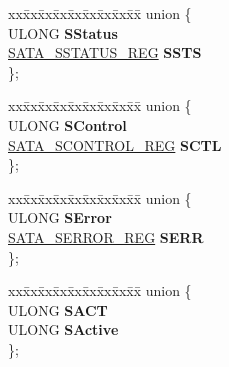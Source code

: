 \begin{DoxyCompactItemize}
\begin{tabbing}
\end{tabbing}\item 
\mbox{\label{struct___i_d_e___a_h_c_i___p_o_r_t___r_e_g_i_s_t_e_r_s_a52a1b2b24ed5332b425832ac3a5ac1ed}} 
\begin{tabbing}
xx\=xx\=xx\=xx\=xx\=xx\=xx\=xx\=xx\=\kill
union \{\\
\>ULONG {\bfseries SStatus}\\
\>\hyperlink{union___s_a_t_a___s_s_t_a_t_u_s___r_e_g}{SATA\_SSTATUS\_REG} {\bfseries SSTS}\\
\}; \\

\end{tabbing}\item 
\mbox{\label{struct___i_d_e___a_h_c_i___p_o_r_t___r_e_g_i_s_t_e_r_s_a0b8e18e28dec36e18c6ea26f394aa512}} 
\begin{tabbing}
xx\=xx\=xx\=xx\=xx\=xx\=xx\=xx\=xx\=\kill
union \{\\
\>ULONG {\bfseries SControl}\\
\>\hyperlink{union___s_a_t_a___s_c_o_n_t_r_o_l___r_e_g}{SATA\_SCONTROL\_REG} {\bfseries SCTL}\\
\}; \\

\end{tabbing}\item 
\mbox{\label{struct___i_d_e___a_h_c_i___p_o_r_t___r_e_g_i_s_t_e_r_s_a6816ce549f7bff97136dfca53bf4bb6c}} 
\begin{tabbing}
xx\=xx\=xx\=xx\=xx\=xx\=xx\=xx\=xx\=\kill
union \{\\
\>ULONG {\bfseries SError}\\
\>\hyperlink{union___s_a_t_a___s_e_r_r_o_r___r_e_g}{SATA\_SERROR\_REG} {\bfseries SERR}\\
\}; \\

\end{tabbing}\item 
\mbox{\label{struct___i_d_e___a_h_c_i___p_o_r_t___r_e_g_i_s_t_e_r_s_aa34228ee4b13c8d5fe78310ee6e93128}} 
\begin{tabbing}
xx\=xx\=xx\=xx\=xx\=xx\=xx\=xx\=xx\=\kill
union \{\\
\>ULONG {\bfseries SACT}\\
\>ULONG {\bfseries SActive}\\
\}; \\


\end{tabbing}
\end{DoxyCompactItemize}
